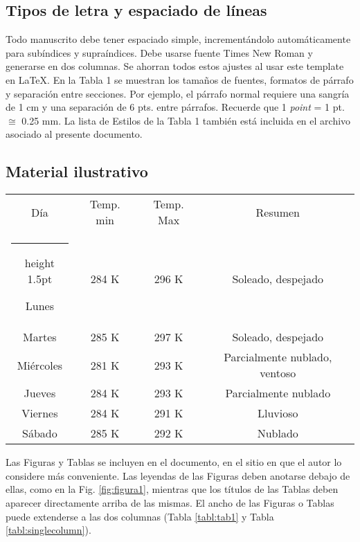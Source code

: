 \documentclass[10pt,twocolumn]{article}
\makeatletter
\newcommand{\thickhline}{%
    \noalign {\ifnum 0=`}\fi \hrule height 1.5pt
    \futurelet \reserved@a \@xhline
}
\makeatother
\begin{document}
\subsection{Tipos de letra y espaciado de líneas}
Todo manuscrito debe tener espaciado simple, incrementándolo automáticamente para subíndices y supraíndices. Debe usarse fuente Times New Roman y generarse en dos columnas. Se ahorran todos estos ajustes al usar este template en \LaTeX.
En la Tabla 1 se muestran los tamaños de fuentes, formatos de párrafo y separación entre secciones. Por ejemplo, el párrafo normal requiere una sangría de 1 cm y una separación de 6 pts. entre párrafos. Recuerde que 1 \emph{point} = 1 pt. $\cong$ 0.25 mm. La lista de Estilos de la Tabla 1 también está incluida en el archivo asociado al presente documento.

\subsection{Material ilustrativo}

\begin{table*}[t]  
\centering
\caption{Estilo recomendado de tabla a doble columna}
\label{tabl:tab1}
\begin{tabular}{|cccc|}
\hline
Día       & Temp. min & Temp. Max & Resumen                       \\ \thickhline
Lunes     & 284 K     & 296 K     & Soleado, despejado            \\ \hline
Martes    & 285 K     & 297 K     & Soleado, despejado            \\ \hline
Miércoles & 281 K      & 293 K     & Parcialmente nublado, ventoso \\ \hline
Jueves    & 284 K     & 293  K     & Parcialmente nublado          \\ \hline
Viernes   & 284 K     & 291 K     & Lluvioso                      \\ \hline
Sábado    & 285 K     & 292 K     & Nublado                       \\ \hline
\end{tabular}
\end{table*}

Las Figuras y Tablas se incluyen en el documento, en el sitio en que el autor lo considere más conveniente. Las leyendas de las Figuras deben anotarse debajo de ellas, como en la Fig. \ref{fig:figura1}, mientras que los títulos de las Tablas deben aparecer directamente arriba de las mismas. El ancho de las Figuras o Tablas puede extenderse a las dos columnas (Tabla \ref{tabl:tab1} y Tabla \ref{tabl:singlecolumn}).
\end{document}
